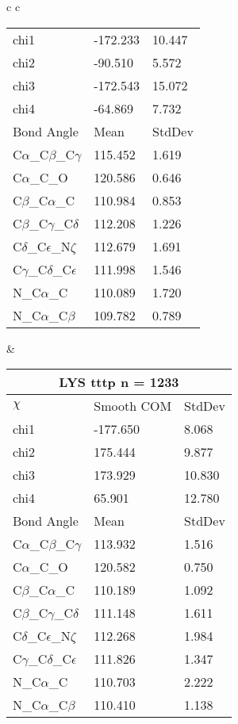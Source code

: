 \begin{longtable}{ c c }
\begin{tabular}{ l l l }
  chi1 & -172.233 & 10.447 \\ 
  chi2 & -90.510 & 5.572 \\ 
  chi3 & -172.543 & 15.072 \\ 
  chi4 & -64.869 & 7.732 \\ \midrule
  Bond Angle   & Mean     & StdDev \\ \midrule
  C$\alpha$\_C$\beta$\_C$\gamma$ & 115.452 & 1.619\\
  C$\alpha$\_C\_O & 120.586 & 0.646\\
  C$\beta$\_C$\alpha$\_C & 110.984 & 0.853\\
  C$\beta$\_C$\gamma$\_C$\delta$ & 112.208 & 1.226\\
  C$\delta$\_C$\epsilon$\_N$\zeta$ & 112.679 & 1.691\\
  C$\gamma$\_C$\delta$\_C$\epsilon$ & 111.998 & 1.546\\
  N\_C$\alpha$\_C & 110.089 & 1.720\\
  N\_C$\alpha$\_C$\beta$ & 109.782 & 0.789\\
  \bottomrule
  \end{tabular}
  &
  \begin{tabular}{ l l l }
  \toprule
  \multicolumn{3}{c}{LYS \textbf{tttp} n = 1233} \\ \toprule
  $\chi$       & Smooth COM & StdDev \\ \midrule
  chi1 & -177.650 & 8.068 \\ 
  chi2 & 175.444 & 9.877 \\ 
  chi3 & 173.929 & 10.830 \\ 
  chi4 & 65.901 & 12.780 \\ \midrule
  Bond Angle   & Mean     & StdDev \\ \midrule
  C$\alpha$\_C$\beta$\_C$\gamma$ & 113.932 & 1.516\\
  C$\alpha$\_C\_O & 120.582 & 0.750\\
  C$\beta$\_C$\alpha$\_C & 110.189 & 1.092\\
  C$\beta$\_C$\gamma$\_C$\delta$ & 111.148 & 1.611\\
  C$\delta$\_C$\epsilon$\_N$\zeta$ & 112.268 & 1.984\\
  C$\gamma$\_C$\delta$\_C$\epsilon$ & 111.826 & 1.347\\
  N\_C$\alpha$\_C & 110.703 & 2.222\\
  N\_C$\alpha$\_C$\beta$ & 110.410 & 1.138\\
  \bottomrule
  \end{tabular}
  \\

\end{longtable}
